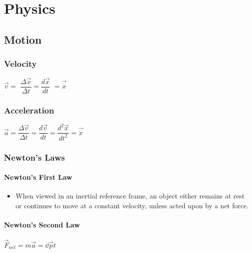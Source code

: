 \chapter{Physics}

	\section{Motion}

\subsection{Velocity}

\begin{itemize}
\itemt \( \vec{v} = \) \( \dfrac{\Delta \vec{x}}{\Delta t} = \dfrac{d \vec{x}}{dt} \) \(= \vec{\dot{x}}  \)
\end{itemize}

\subsection{Acceleration}

\begin{itemize}
\itemt \( \vec{a} = \dfrac{\Delta \vec{v}}{\Delta t} = \dfrac{d \vec{v}}{dt} = \dfrac{d^2 \vec{x}}{dt^2} = \vec{\ddot{x}}  \)	
\end{itemize}            
		
\subsection{Newton's Laws}

\subsubsection{Newton's First Law}
\begin{itemize}
\item When viewed in an inertial reference frame, an object either remains at rest or continues to move at a constant velocity, unless acted upon by a net force.
\end{itemize}

\subsubsection{Newton's Second Law}
\begin{itemize}
\itemt \(\vec{F}_{net} = m\vec{a} = \dd{\vec{p}}{t}	\)
\end{itemize}

